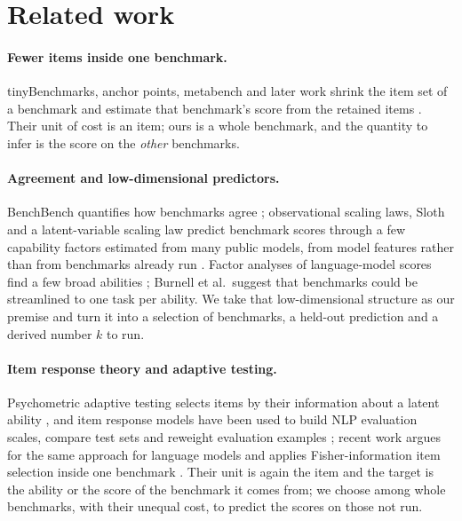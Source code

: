 \section{Related work}
\label{sec:related}
\paragraph{Fewer items inside one benchmark.}
tinyBenchmarks, anchor points, metabench and later work shrink the item set of a benchmark and estimate that benchmark's score from the retained items \citep{polo2024tinybenchmarks,vivek2024anchor,kipnis2024metabench,perlitz2024efficient,hofmann2025fluid,yauney2025reliable}.
Their unit of cost is an item; ours is a whole benchmark, and the quantity to infer is the score on the \emph{other} benchmarks.
\paragraph{Agreement and low-dimensional predictors.}
BenchBench quantifies how benchmarks agree \citep{perlitz2024benchbench}; observational scaling laws, Sloth and a latent-variable scaling law predict benchmark scores through a few capability factors estimated from many public models, from model features rather than from benchmarks already run \citep{ruan2024observational,polo2024sloth,cai2025latent}.
Factor analyses of language-model scores find a few broad abilities \citep{burnell2023revealing,ilic2023evidence}; Burnell et al.\ suggest that benchmarks could be streamlined to one task per ability.
We take that low-dimensional structure as our premise and turn it into a selection of benchmarks, a held-out prediction and a derived number $k$ to run.
\paragraph{Item response theory and adaptive testing.}
Psychometric adaptive testing selects items by their information about a latent ability \citep{segall1996multidimensional}, and item response models have been used to build NLP evaluation scales, compare test sets and reweight evaluation examples \citep{lalor2016building,vania2021comparing,rodriguez2021evaluation,lalor2024irt}; recent work argues for the same approach for language models and applies Fisher-information item selection inside one benchmark \citep{zhuang2023position,li2025atlas}.
Their unit is again the item and the target is the ability or the score of the benchmark it comes from; we choose among whole benchmarks, with their unequal cost, to predict the scores on those not run.
